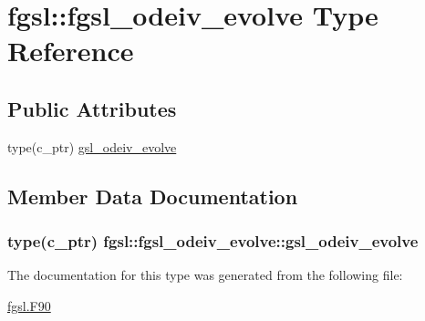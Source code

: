 \hypertarget{structfgsl_1_1fgsl__odeiv__evolve}{\section{fgsl\-:\-:fgsl\-\_\-odeiv\-\_\-evolve Type Reference}
\label{structfgsl_1_1fgsl__odeiv__evolve}
}
\subsection*{Public Attributes}
\begin{DoxyCompactItemize}
\item 
type(c\-\_\-ptr) \hyperlink{structfgsl_1_1fgsl__odeiv__evolve_aa53db1afa78765924e2ee9be04dab5e9}{gsl\-\_\-odeiv\-\_\-evolve}
\end{DoxyCompactItemize}


\subsection{Member Data Documentation}
\hypertarget{structfgsl_1_1fgsl__odeiv__evolve_aa53db1afa78765924e2ee9be04dab5e9}{
\subsubsection[{gsl\-\_\-odeiv\-\_\-evolve}]{\setlength{\rightskip}{0pt plus 5cm}type(c\-\_\-ptr) fgsl\-::fgsl\-\_\-odeiv\-\_\-evolve\-::gsl\-\_\-odeiv\-\_\-evolve}}\label{structfgsl_1_1fgsl__odeiv__evolve_aa53db1afa78765924e2ee9be04dab5e9}


The documentation for this type was generated from the following file\-:\begin{DoxyCompactItemize}
\item 
\hyperlink{fgsl_8F90}{fgsl.\-F90}\end{DoxyCompactItemize}
